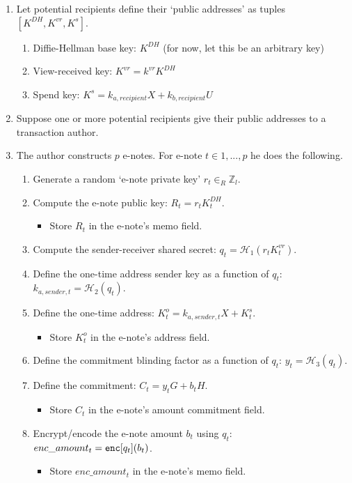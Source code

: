 \begin{enumerate}
    \item Let potential recipients define their `public addresses' as tuples $[K^{DH}, K^{vr}, K^s]$.
    \begin{enumerate}
        \item Diffie-Hellman base key: $K^{DH}$ (for now, let this be an arbitrary key)
        \item View-received key: $K^{vr} = k^{vr} K^{DH}$
        \item Spend key: $K^s = k_{a,recipient} X + k_{b,recipient} U$
    \end{enumerate}

    \item Suppose one or more potential recipients give their public addresses to a transaction author.

    \item The author constructs $p$ e-notes. For e-note $t \in 1,...,p$ he does the following.
    \begin{enumerate}
        \item Generate a random `e-note private key' $r_t \in_R \mathbb{Z}_l$.
        \item Compute the e-note public key: $R_t = r_t K^{DH}_t$.
        \begin{itemize}
            \item Store $R_t$ in the e-note's memo field.
        \end{itemize}
        \item Compute the sender-receiver shared secret: $q_t = \mathcal{H}_1(r_t K^{vr}_t)$.
        \item Define the one-time address sender key as a function of $q_t$: $k_{a,sender,t} = \mathcal{H}_2(q_t)$.
        \item Define the one-time address: $K^o_t = k_{a,sender,t} X + K^s_t$.
        \begin{itemize}
            \item Store $K^o_t$ in the e-note's address field.
        \end{itemize}
        \item Define the commitment blinding factor as a function of $q_t$: $y_t = \mathcal{H}_3(q_t)$.
        \item Define the commitment: $C_t = y_t G + b_t H$.
        \begin{itemize}
            \item Store $C_t$ in the e-note's amount commitment field.
        \end{itemize}
        \item Encrypt/encode the e-note amount $b_t$ using $q_t$: $enc\_amount_t = \textrm{\tt enc}[q_t](b_t)$.
        \begin{itemize}
            \item Store $enc\_amount_t$ in the e-note's memo field.
        \end{itemize}
    \end{enumerate}


\end{enumerate}
